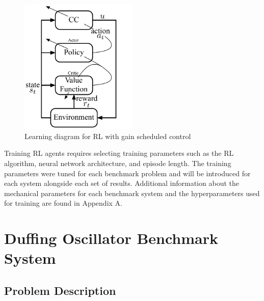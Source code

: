 \begin{figure}[tb]
    \begin{center}
    \includegraphics[width = 0.5\textwidth]{figures/figures_RL_model_based_control/Actor_Critic_diagram_gain_sched.pdf}
    \caption{Learning diagram for RL with gain scheduled control} 
    \label{fig_chap2:gain_sched_actor_critic}
    \end{center}
\end{figure}
%

Training RL agents requires selecting training parameters such as the RL algorithm, neural network architecture, and episode length. The training parameters were tuned for each benchmark problem and will be introduced for each system alongside each set of results. Additional information about the mechanical parameters for each benchmark system and the hyperparameters used for training are found in Appendix A.

\section{Duffing Oscillator Benchmark System}
\label{sec_chap2:Duffing_oscillator}
\subsection{Problem Description}

